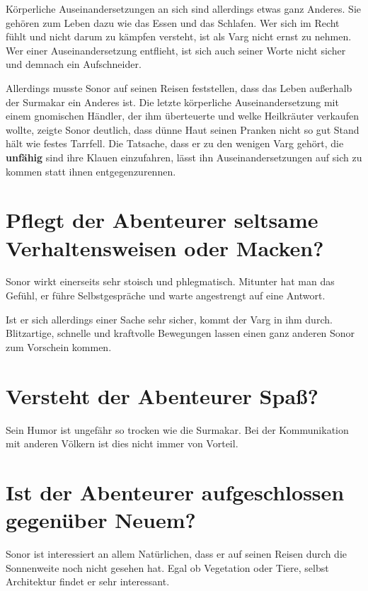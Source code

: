 \documentclass{article}
\begin{document}
	Körperliche Auseinandersetzungen an sich sind allerdings etwas ganz
	Anderes. Sie gehören zum Leben dazu wie das Essen und das Schlafen.
	Wer sich im Recht fühlt und nicht darum zu kämpfen versteht, ist als
	Varg nicht ernst zu nehmen. Wer einer Auseinandersetzung entflieht,
	ist sich auch seiner Worte nicht sicher und demnach ein Aufschneider.

	Allerdings musste Sonor auf seinen Reisen feststellen, dass das Leben
	außerhalb der Surmakar ein Anderes ist. Die letzte körperliche
	Auseinandersetzung mit einem gnomischen Händler, der ihm überteuerte
	und welke Heilkräuter verkaufen wollte, zeigte Sonor deutlich, dass
	dünne Haut seinen Pranken nicht so gut Stand hält wie festes Tarrfell.
	Die Tatsache, dass er zu den wenigen Varg gehört, die \textbf{unfähig}
	sind ihre Klauen einzufahren, lässt ihn Auseinandersetzungen auf sich zu
	kommen statt ihnen entgegenzurennen.


	\section[Macken]{Pflegt der Abenteurer seltsame Verhaltensweisen oder Macken?}

	Sonor wirkt einerseits sehr stoisch und phlegmatisch.
	Mitunter hat man das Gefühl, er führe Selbstgespräche und warte
	angestrengt auf eine Antwort.

	Ist er sich allerdings einer Sache sehr sicher, kommt der Varg in ihm
	durch. Blitzartige, schnelle und kraftvolle Bewegungen lassen einen ganz
	anderen Sonor zum Vorschein kommen.
	

	\section[Humor]{Versteht der Abenteurer Spaß?}
	

	Sein Humor ist ungefähr so trocken wie die Surmakar. Bei der
	Kommunikation mit anderen Völkern ist dies nicht immer von Vorteil.


	\section[Aufgeschlossenheit]{Ist der Abenteurer aufgeschlossen gegenüber Neuem?}
	

	Sonor ist interessiert an allem Natürlichen, dass er auf seinen Reisen
	durch die Sonnenweite noch nicht gesehen hat. Egal ob Vegetation oder
	Tiere, selbst Architektur findet er sehr interessant.
\end{document}
